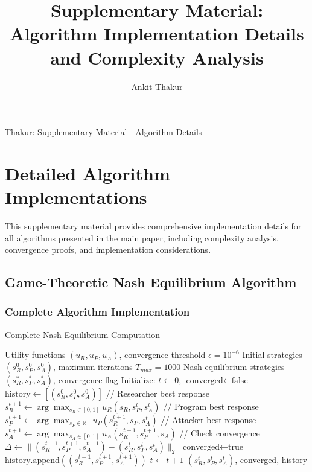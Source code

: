 \documentclass[journal]{IEEEtran}
\begin{document}
\title{Supplementary Material: Algorithm Implementation Details and Complexity Analysis}

\author{Ankit Thakur}

%
{Thakur: Supplementary Material - Algorithm Details}

\maketitle

\section{Detailed Algorithm Implementations}

This supplementary material provides comprehensive implementation details for all algorithms presented in the main paper, including complexity analysis, convergence proofs, and implementation considerations.

\subsection{Game-Theoretic Nash Equilibrium Algorithm}

\subsubsection{Complete Algorithm Implementation}

\begin{algorithm}[H]
\caption{Complete Nash Equilibrium Computation}
\label{alg:nash_complete}
\begin{algorithmic}[1]
\REQUIRE Utility functions $(u_R, u_P, u_A)$, convergence threshold $\epsilon = 10^{-6}$
\REQUIRE Initial strategies $(s_R^0, s_P^0, s_A^0)$, maximum iterations $T_{max} = 1000$
\ENSURE Nash equilibrium strategies $(s_R^*, s_P^*, s_A^*)$, convergence flag
\STATE Initialize: $t \leftarrow 0$, $\text{converged} \leftarrow \text{false}$
\STATE $\text{history} \leftarrow [(s_R^0, s_P^0, s_A^0)]$
    \STATE // Researcher best response
    \STATE $s_R^{t+1} \leftarrow \arg\max_{s_R \in [0,1]} u_R(s_R, s_P^t, s_A^t)$
    \STATE // Program best response
    \STATE $s_P^{t+1} \leftarrow \arg\max_{s_P \in \mathbb{R}_+} u_P(s_R^{t+1}, s_P, s_A^t)$
    \STATE // Attacker best response
    \STATE $s_A^{t+1} \leftarrow \arg\max_{s_A \in [0,1]} u_A(s_R^{t+1}, s_P^{t+1}, s_A)$
    \STATE // Check convergence
    \STATE $\Delta \leftarrow \|(s_R^{t+1}, s_P^{t+1}, s_A^{t+1}) - (s_R^t, s_P^t, s_A^t)\|_2$
    \IF{$\Delta < \epsilon$}
        \STATE $\text{converged} \leftarrow \text{true}$
    \ENDIF
    \STATE $\text{history}.\text{append}((s_R^{t+1}, s_P^{t+1}, s_A^{t+1}))$
    \STATE $t \leftarrow t + 1$
\ENDWHILE
\RETURN $(s_R^{t}, s_P^{t}, s_A^{t})$, converged, history
\end{algorithmic}
\end{algorithm}
\end{document}
